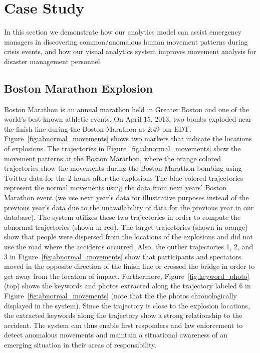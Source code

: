 \section{Case Study}
In this section we demonstrate how our analytics model can assist emergency managers in discovering common/anomalous human movement patterns during crisis events, and how our visual analytics system improves movement analysis for disaster management personnel.

\subsection{Boston Marathon Explosion}
\label{sec:boston_marathon}

Boston Marathon is an annual marathon held in Greater Boston and one of the world's best-known athletic events.
On April 15, 2013, two bombs exploded near the finish line during the Boston Marathon at 2:49 pm EDT.
Figure~\ref{fig:abnormal_movements} shows two markers that indicate the locations of explosions.
The trajectories in Figure~\ref{fig:abnormal_movements} show the movement patterns at the Boston Marathon, where the orange colored trajectories show the movements during the Boston Marathon bombing using Twitter data for the 2 hours after the explosions
The blue colored trajectories represent the normal movements using the data from next years' Boston Marathon event (we use next year's data for illustrative purposes instead of the previous year's data due to the unavailability of data for the previous year in our database).
The system utilizes these two trajectories in order to compute the abnormal trajectories (shown in red). 
The target trajectories (shown in orange) show that people were dispersed from the locations of the explosions and did not use the road where the accidents occurred.
Also, the outlier trajectories 1, 2, and 3 in Figure~\ref{fig:abnormal_movements} show that participants and spectators moved in the opposite direction of the finish line or crossed the bridge in order to get away from the location of impact.
Furthermore, Figure~\ref{fig:keyword_photo} (top) shows the keywords and photos extracted along the trajectory labeled 6 in Figure~\ref{fig:abnormal_movements} (note that the the photos chronologically displayed in the system).
Since the trajectory is close to the explosion locations, the extracted keywords along the trajectory show a strong relationship to the accident.
The system can thus enable first responders and law enforcement to detect anomalous movements and maintain a situational awareness of an emerging situation in their areas of responsibility. 

